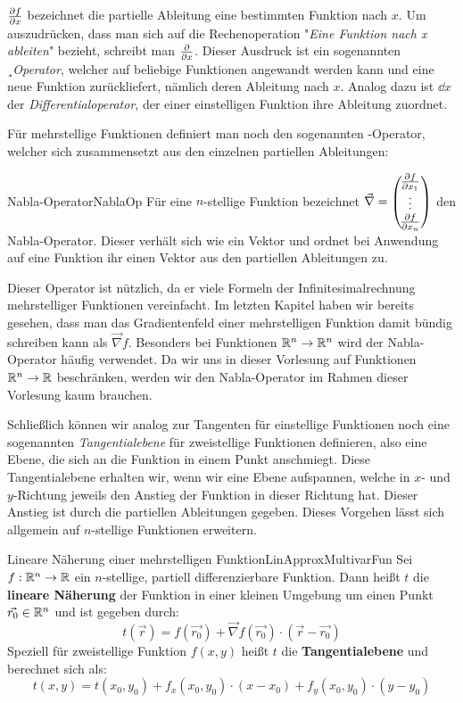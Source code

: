 $\frac{\partial f}{\partial x}$ bezeichnet die partielle Ableitung eine bestimmten Funktion nach $x$. Um auszudrücken, dass man sich auf die Rechenoperation "\emph{Eine Funktion nach x ableiten}" bezieht, schreibt man $\frac{\partial }{\partial x}$. Dieser Ausdruck ist ein sogenannten ¸\emph{Operator}, welcher auf beliebige Funktionen angewandt werden kann und eine neue Funktion zurückliefert, nämlich deren Ableitung nach $x$. Analog dazu ist $\dd{}{x}$ der \emph{Differentialoperator}, der einer einstelligen Funktion ihre Ableitung zuordnet.

Für mehrstellige Funktionen definiert man noch den sogenannten -Operator, welcher sich zusammensetzt aus den einzelnen partiellen Ableitungen:

\begin{definition}{Nabla-Operator}{NablaOp}
    Für eine $n$-stellige Funktion bezeichnet $\vec \nabla = \left(\negthinspace\begin{matrix}\frac{\partial f}{\partial x_1}\\\vdots\\\frac{\partial f}{\partial x_n}\end{matrix}\right)$ den Nabla-Operator. Dieser verhält sich wie ein Vektor und ordnet bei Anwendung auf eine Funktion ihr einen Vektor aus den partiellen Ableitungen zu.
\end{definition}

Dieser Operator ist nützlich, da er viele Formeln der Infinitesimalrechnung mehrstelliger Funktionen vereinfacht. Im letzten Kapitel haben wir bereits gesehen, dass man das Gradientenfeld einer mehrstelligen Funktion damit bündig schreiben kann als $\vec\nabla f$. Besonders bei Funktionen $\mathbb{R}^n \to \mathbb{R}^n$ wird der Nabla-Operator häufig verwendet. Da wir uns in dieser Vorlesung auf Funktionen $\mathbb{R}^n\to\mathbb{R}$ beschränken, werden wir den Nabla-Operator im Rahmen dieser Vorlesung kaum brauchen.

Schließlich können wir analog zur Tangenten für einstellige Funktionen noch eine sogenannten \emph{Tangentialebene} für zweistellige Funktionen definieren, also eine Ebene, die sich an die Funktion in einem Punkt anschmiegt. Diese Tangentialebene erhalten wir, wenn wir eine Ebene aufspannen, welche in $x$- und $y$-Richtung jeweils den Anstieg der Funktion in dieser Richtung hat. Dieser Anstieg ist durch die partiellen Ableitungen gegeben. Dieses Vorgehen lässt sich allgemein auf $n$-stellige Funktionen erweitern.

\begin{definition}{Lineare Näherung einer mehrstelligen Funktion}{LinApproxMultivarFun}
    Sei $f: \mathbb{R}^n\to\mathbb{R}$ ein $n$-stellige, partiell differenzierbare Funktion. Dann heißt $t$ die \textbf{lineare Näherung} der Funktion in einer kleinen Umgebung um einen Punkt $\vec{r_0}\in\mathbb{R}^n$ und ist gegeben durch:
    $$
        t(\vec r) = f(\vec{r_0}) +  \vec{\nabla}f(\vec{r_0}) \cdot (\vec{r} - \vec{r_0})
    $$
    Speziell für zweistellige Funktion $f(x,y)$ heißt $t$ die \textbf{Tangentialebene} und berechnet sich als:
    $$
        t(x,y) = t(x_0,y_0) + f_x(x_0,y_0) \cdot (x-x_0) + f_y(x_0,y_0) \cdot (y-y_0)
    $$
\end{definition}

